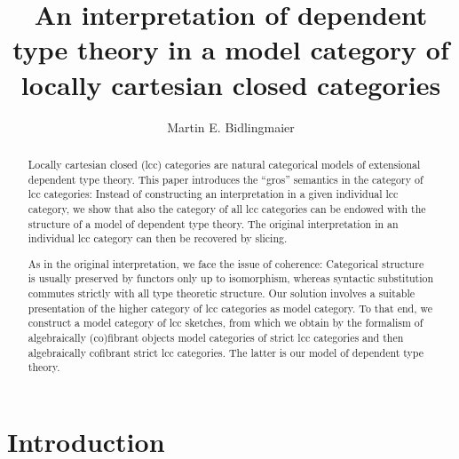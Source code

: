 \documentclass[a4paper]{article}
\theoremstyle{remark}
\theoremstyle{definition}
\begin{document}
\title{An interpretation of dependent type theory in a model category of locally cartesian closed categories}

\author{Martin E. Bidlingmaier}

\date{}

\maketitle

\begin{abstract}
  Locally cartesian closed (lcc) categories are natural categorical models of extensional dependent type theory.
  This paper introduces the ``gros'' semantics in the category of lcc categories:
  Instead of constructing an interpretation in a given individual lcc category, we show that also the category of all lcc categories can be endowed with the structure of a model of dependent type theory.
  The original interpretation in an individual lcc category can then be recovered by slicing.

  As in the original interpretation, we face the issue of coherence:
  Categorical structure is usually preserved by functors only up to isomorphism, whereas syntactic substitution commutes strictly with all type theoretic structure.
  Our solution involves a suitable presentation of the higher category of lcc categories as model category.
  To that end, we construct a model category of lcc sketches, from which we obtain by the formalism of algebraically (co)fibrant objects model categories of strict lcc categories and then algebraically cofibrant strict lcc categories.
  The latter is our model of dependent type theory.
\end{abstract}

\section{Introduction}
\end{document}
